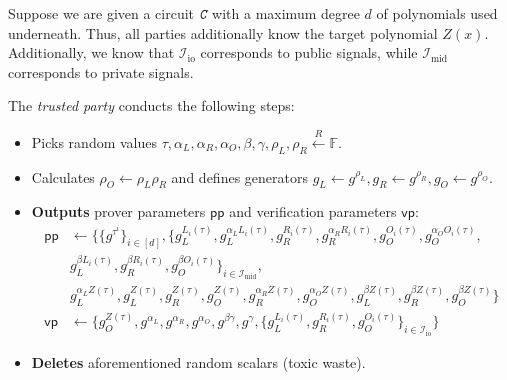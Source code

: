 \documentclass[../lecture-notes-148x210.tex]{subfiles}
\begin{document}
\begin{tcolorbox}[title=Pinocchio Protocol,
    breakable,
    colback=blue!5!white,
    colframe=blue!75!black,
    colbacktitle=blue!25!white,
    coltitle=blue!20!black,
    fonttitle=\bfseries,
    boxrule=1.25pt,
    subtitle style={boxrule=0pt,
    colback=blue!20!white,
    colupper=blue!75!gray} ]
    \small
    Suppose we are given a circuit $\textit{\texttt{C}}$ with a maximum degree $d$ of polynomials used underneath. Thus, all parties additionally know the target polynomial $Z(x)$. Additionally, we know that $\mathcal{I}_{\text{io}}$ corresponds to public signals, while $\mathcal{I}_{\text{mid}}$ corresponds to private signals.

    The \emph{trusted party} conducts the following steps:
    \begin{itemize}[label=]
        \item Picks random values $\tau, \alpha_L, \alpha_R, \alpha_O, \beta, \gamma, \rho_L, \rho_R \xleftarrow{R} \mathbb{F}$.
        \item Calculates $\rho_O \gets \rho_L\rho_R$ and defines generators $g_L \gets g^{\rho_L}, g_R \gets g^{\rho_R}, g_O \gets g^{\rho_O}$.
        \item \textbf{Outputs} prover parameters $\mathsf{pp}$ and verification parameters $\mathsf{vp}$:
        \begin{align*}
            \mathsf{pp} &\gets \big\{\{g^{\tau^i}\}_{i \in [d]}, \{g_L^{L_i(\tau)}, g_L^{\alpha_LL_i(\tau)}, g_R^{R_i(\tau)}, g_R^{\alpha_RR_i(\tau)}, g_O^{O_i(\tau)}, g_O^{\alpha_O O_i(\tau)}, \\ 
            & g_L^{\beta L_i(\tau)}, g_R^{\beta R_i(\tau)}, g_O^{\beta O_i(\tau)}\}_{i \in \mathcal{I}_{\text{mid}}}, \\ 
            & g_L^{\alpha_L Z(\tau)}, g_L^{Z(\tau)}, g_R^{Z(\tau)}, g_O^{Z(\tau)}, g_R^{\alpha_R Z(\tau)}, g_O^{\alpha_O Z(\tau)}, g_L^{\beta Z(\tau)}, g_R^{\beta Z(\tau)}, g_O^{\beta Z(\tau)}\big\} \\
            \mathsf{vp} &\gets \big\{ g_O^{Z(\tau)}, g^{\alpha_L}, g^{\alpha_R}, g^{\alpha_O}, g^{\beta\gamma}, g^{\gamma}, \{g_L^{L_i(\tau)}, g_R^{R_i(\tau)}, g_O^{O_i(\tau)}\}_{i \in \mathcal{I}_{\text{io}}} \big\}
        \end{align*}
        \item \textbf{Deletes} aforementioned random scalars (toxic waste).
    \end{itemize}

\end{tcolorbox}
\end{document}
